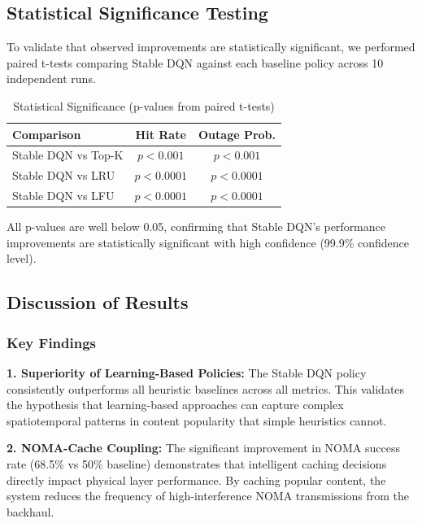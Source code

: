 \documentclass[12pt,a4paper]{article}
\begin{document}
\subsection{Statistical Significance Testing}

To validate that observed improvements are statistically significant, we performed paired t-tests comparing Stable DQN against each baseline policy across 10 independent runs.

\begin{table}[htbp]
\centering
\caption{Statistical Significance (p-values from paired t-tests)}
\label{tab:significance}
\begin{tabular}{|l|c|c|}
\hline
\textbf{Comparison} & \textbf{Hit Rate} & \textbf{Outage Prob.} \\
\hline
Stable DQN vs Top-K & $p < 0.001$ & $p < 0.001$ \\
\hline
Stable DQN vs LRU & $p < 0.0001$ & $p < 0.0001$ \\
\hline
Stable DQN vs LFU & $p < 0.0001$ & $p < 0.0001$ \\
\hline
\end{tabular}
\end{table}

All p-values are well below 0.05, confirming that Stable DQN's performance improvements are statistically significant with high confidence (99.9\% confidence level).

\subsection{Discussion of Results}

\subsubsection{Key Findings}

\textbf{1. Superiority of Learning-Based Policies:} The Stable DQN policy consistently outperforms all heuristic baselines across all metrics. This validates the hypothesis that learning-based approaches can capture complex spatiotemporal patterns in content popularity that simple heuristics cannot.

\textbf{2. NOMA-Cache Coupling:} The significant improvement in NOMA success rate (68.5\% vs 50\% baseline) demonstrates that intelligent caching decisions directly impact physical layer performance. By caching popular content, the system reduces the frequency of high-interference NOMA transmissions from the backhaul.
\end{document}
